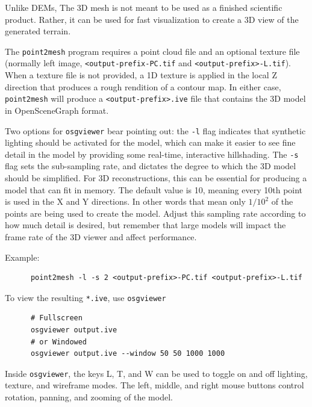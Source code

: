 Unlike DEMs, The 3D mesh is not meant to be used as a finished
scientific product.  Rather, it can be used for fast visualization
to create a 3D view of the generated terrain.

The \texttt{point2mesh} program requires a point cloud file and an
optional texture file (normally left image, \texttt{<output-prefix-PC.tif}
and \texttt{<output-prefix>-L.tif}). When a texture file is not
provided, a 1D texture is applied in the local Z direction that
produces a rough rendition of a contour map.  In either case,
\texttt{point2mesh} will produce a \texttt{<output-prefix>.ive}
file that contains the 3D model in OpenSceneGraph format.

Two options for \texttt{osgviewer} bear pointing out: the \texttt{-l}
flag indicates that synthetic lighting should be activated for the
model, which can make it easier to see fine detail in the model by
providing some real-time, interactive hillshading.  The \verb#-s#
flag sets the sub-sampling rate, and dictates the degree to which
the 3D model should be simplified.  For 3D reconstructions, this
can be essential for producing a model that can fit in memory.  The
default value is 10, meaning every 10th point is used in the X and
Y directions. In other words that mean only $1/10^2$ of the points
are being used to create the model. Adjust this sampling rate
according to how much detail is desired, but remember that large
models will impact the frame rate of the 3D viewer and affect
performance.

Example:
\begin{verbatim}
      point2mesh -l -s 2 <output-prefix>-PC.tif <output-prefix>-L.tif
\end{verbatim}

To view the resulting \verb#*.ive#, use \verb#osgviewer#

\begin{verbatim}
      # Fullscreen
      osgviewer output.ive
      # or Windowed
      osgviewer output.ive --window 50 50 1000 1000
\end{verbatim}

Inside \verb#osgviewer#, the keys L, T, and W can be used to toggle on
and off lighting, texture, and wireframe modes.  The left, middle, and
right mouse buttons control rotation, panning, and zooming of the
model.

